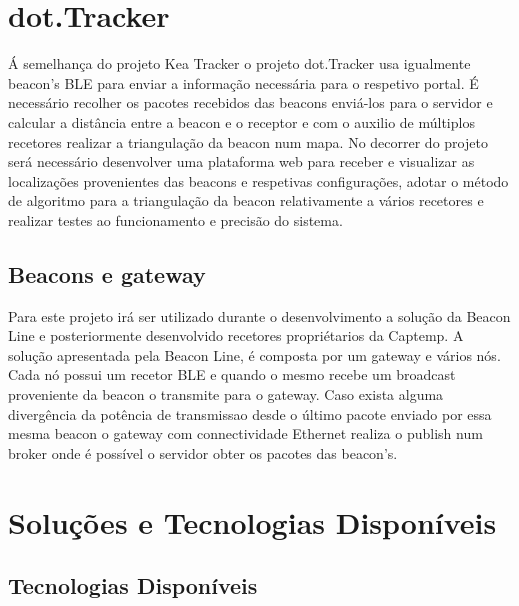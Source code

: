 \section {dot.Tracker}\label{dot}
Á semelhança do projeto Kea Tracker o projeto dot.Tracker usa igualmente beacon's BLE para enviar a informação necessária para o respetivo portal. É necessário recolher os pacotes recebidos das beacons enviá-los para o servidor e calcular a distância entre a beacon e o receptor e com o auxilio de múltiplos recetores realizar a triangulação da beacon num mapa. No decorrer do projeto será necessário desenvolver uma plataforma web para receber e visualizar as localizações provenientes das beacons e respetivas configurações, adotar o método de algoritmo para a triangulação da beacon relativamente a vários recetores e realizar testes ao funcionamento e precisão do sistema.
\subsection{Beacons e gateway}
 Para este projeto irá ser utilizado durante o desenvolvimento a solução da Beacon Line\cite{taskit} e posteriormente desenvolvido recetores propriétarios da Captemp. A solução apresentada pela Beacon Line, é composta por um gateway e vários nós. Cada nó possui um recetor BLE e quando o mesmo recebe um broadcast proveniente da beacon o transmite para o gateway. Caso exista alguma divergência da potência de transmissao desde o último pacote enviado por essa mesma beacon o gateway com connectividade Ethernet realiza o publish num broker onde é possível o servidor obter os pacotes das beacon's.



\section{Soluções e Tecnologias Disponíveis} \label{solucoesDisponiveis}
\subsection{Tecnologias Disponíveis}
